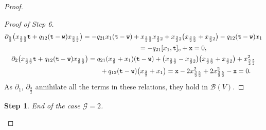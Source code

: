 \documentclass[10pt,a4paper]{amsart}
\numberwithin{equation}{section}
\newtheorem{stepiv}{Step}
\newcommand{\toba}{\mathscr B}
\newcommand{\ghost}{\mathscr{G}}
\newcommand{\ttt}{\mathtt{t}}
\newcommand{\wt}{\mathtt{w}}
\newcommand{\xt}{\mathtt{x}}
\newcommand{\tresdos}{\frac{3}{2}}
\newcommand{\cincodos}{\frac{5}{2}}
\begin{document}
\begin{proof}
\begin{proof}[Proof of Step 6]
\begin{gather*}
\partial_{\cincodos} \big(x_{\tresdos\cincodos} \ttt +q_{12}(\ttt-\wt)x_{\tresdos\cincodos}\big)=
-q_{21}x_1 (\ttt-\wt) + x_{\tresdos\cincodos}x_{\tresdos2}+x_{\tresdos2}\big(x_{\tresdos\cincodos}+x_{\tresdos2}\big)-q_{12}(\ttt-\wt)x_1
\\ \hphantom{\partial_{\cincodos} \big(x_{\tresdos\cincodos} \ttt +q_{12}(\ttt-\wt)x_{\tresdos\cincodos}\big)}
{} = -q_{21}[x_1,\ttt]_c+\xt = 0,
\\
\partial_{2} \big(x_{\tresdos\cincodos} \ttt +q_{12}(\ttt-\wt)x_{\tresdos\cincodos}\big) =
q_{21}(x_{\tresdos}+x_1) (\ttt-\wt) +\big(x_{\tresdos\cincodos}-x_{\tresdos2}\big)\big(x_{\tresdos\cincodos}+x_{\tresdos2}\big)+ x_{\tresdos\cincodos}^2
\\ \hphantom{\partial_{2} \big(x_{\tresdos\cincodos} \ttt +q_{12}(\ttt-\wt)x_{\tresdos\cincodos}\big) =}
 +q_{12}(\ttt-\wt)\big(x_{\tresdos}+x_1\big)
= \xt-2x_{\tresdos\cincodos}^2+ 2x_{\tresdos\cincodos}^2-\xt=0.
\end{gather*}
As $\partial_1$, $\partial_{\tresdos}$ annihilate all the terms in these relations, they hold in $\toba(V)$.
\end{proof}

\begin{stepiv}
End of the case $\ghost = 2$.
\end{stepiv}


\end{proof}
\end{document}
